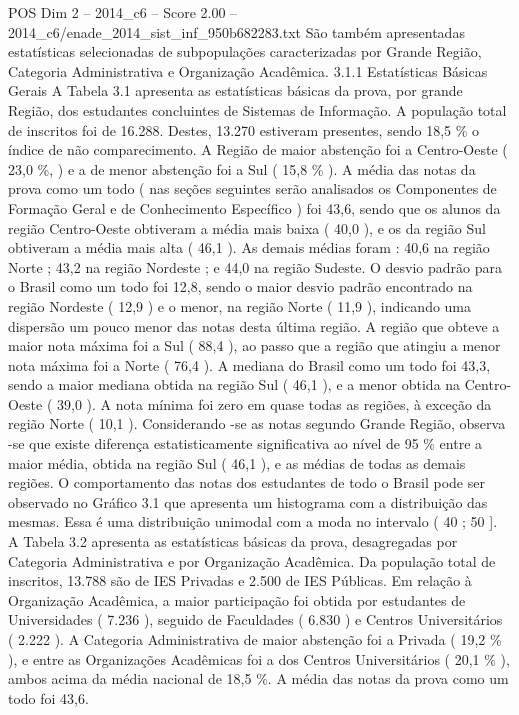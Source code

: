 \begin{textsample}{POS Dim 2 – 2014\_c6 – Score 2.00 – 2014\_c6/enade\_2014\_sist\_inf\_950b682283.txt}
São também apresentadas estatísticas selecionadas de subpopulações caracterizadas por Grande Região, Categoria Administrativa e Organização Acadêmica. 3.1.1 Estatísticas Básicas Gerais A Tabela 3.1 apresenta as estatísticas básicas da prova, por grande Região, dos estudantes concluintes de Sistemas de Informação.
A população total de inscritos foi de 16.288.
Destes, 13.270 estiveram presentes, sendo 18,5 \% o índice de não comparecimento.
A Região de maior abstenção foi a Centro-Oeste ( 23,0 \%, ) e a de menor abstenção foi a Sul ( 15,8 \% ).
A média das notas da prova como um todo ( nas seções seguintes serão analisados os Componentes de Formação Geral e de Conhecimento Específico ) foi 43,6, sendo que os alunos da região Centro-Oeste obtiveram a média mais baixa ( 40,0 ), e os da região Sul obtiveram a média mais alta ( 46,1 ).
As demais médias foram : 40,6 na região Norte ; 43,2 na região Nordeste ; e 44,0 na região Sudeste.
O desvio padrão para o Brasil como um todo foi 12,8, sendo o maior desvio padrão encontrado na região Nordeste ( 12,9 ) e o menor, na região Norte ( 11,9 ), indicando uma dispersão um pouco menor das notas desta última região.
A região que obteve a maior nota máxima foi a Sul ( 88,4 ), ao passo que a região que atingiu a menor nota máxima foi a Norte ( 76,4 ).
A mediana do Brasil como um todo foi 43,3, sendo a maior mediana obtida na região Sul ( 46,1 ), e a menor obtida na Centro-Oeste ( 39,0 ).
A nota mínima foi zero em quase todas as regiões, à exceção da região Norte ( 10,1 ).
Considerando -se as notas segundo Grande Região, observa -se que existe diferença estatisticamente significativa ao nível de 95 \% entre a maior média, obtida na região Sul ( 46,1 ), e as médias de todas as demais regiões.
O comportamento das notas dos estudantes de todo o Brasil pode ser observado no Gráfico 3.1 que apresenta um histograma com a distribuição das mesmas.
Essa é uma distribuição unimodal com a moda no intervalo ( 40 ; 50 ].
A Tabela 3.2 apresenta as estatísticas básicas da prova, desagregadas por Categoria Administrativa e por Organização Acadêmica.
Da população total de inscritos, 13.788 são de IES Privadas e 2.500 de IES Públicas.
Em relação à Organização Acadêmica, a maior participação foi obtida por estudantes de Universidades ( 7.236 ), seguido de Faculdades ( 6.830 ) e Centros Universitários ( 2.222 ).
A Categoria Administrativa de maior abstenção foi a Privada ( 19,2 \% ), e entre as Organizações Acadêmicas foi a dos Centros Universitários ( 20,1 \% ), ambos acima da média nacional de 18,5 \%.
A média das notas da prova como um todo foi 43,6.

\end{textsample}
